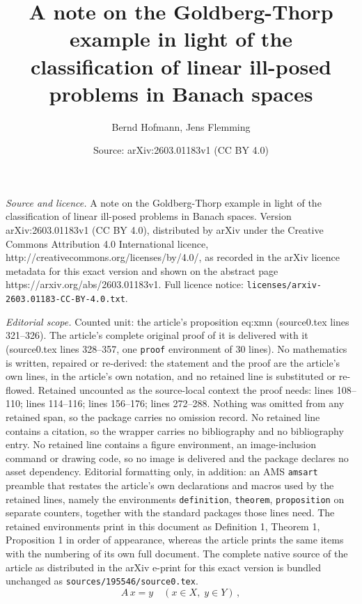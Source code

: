 \documentclass[10pt,a4paper]{amsart}
\title{A note on the Goldberg-Thorp example in light of the classification of linear ill-posed problems in Banach spaces}
\author{Bernd Hofmann, Jens Flemming}
\date{Source: arXiv:2603.01183v1 (CC BY 4.0)}
\begin{document}
\maketitle

\noindent\emph{Source and licence.} A note on the Goldberg-Thorp example in light of the classification of linear ill-posed problems in Banach spaces. Version arXiv:2603.01183v1 (CC BY 4.0), distributed by arXiv under the Creative Commons Attribution 4.0 International licence, http://creativecommons.org/licenses/by/4.0/, as recorded in the arXiv licence metadata for this exact version and shown on the abstract page https://arxiv.org/abs/2603.01183v1. Full licence notice: \texttt{licenses/arxiv-2603.01183-CC-BY-4.0.txt}.\par\smallskip

\noindent\textit{Editorial scope.} Counted unit: the article's proposition eq:xmn (source0.tex lines 321--326). The article's complete original proof of it is delivered with it (source0.tex lines 328--357, one \texttt{proof} environment of 30 lines). No mathematics is written, repaired or re-derived: the statement and the proof are the article's own lines, in the article's own notation, and no retained line is substituted or re-flowed.  Retained uncounted as the source-local context the proof needs: lines 108--110; lines 114--116; lines 156--176; lines 272--288.  Nothing was omitted from any retained span, so the package carries no omission record.  No retained line contains a citation, so the wrapper carries no bibliography and no bibliography entry.  No retained line contains a figure environment, an image-inclusion command or drawing code, so no image is delivered and the package declares no asset dependency.  Editorial formatting only, in addition: an AMS \texttt{amsart} preamble that restates the article's own declarations and macros used by the retained lines, namely the environments \texttt{definition}, \texttt{theorem}, \texttt{proposition} on separate counters, together with the standard packages those lines need.  The retained environments print in this document as Definition 1, Theorem 1, Proposition 1 in order of appearance, whereas the article prints the same items with the numbering of its own full document.  The complete native source of the article as distributed in the arXiv e-print for this exact version is bundled unchanged as \texttt{sources/195546/source0.tex}.
\begin{equation}\label{eq:opeq}
A\, x =y  \quad (x \in X,\; y \in Y)\,,
\end{equation}
\end{document}
